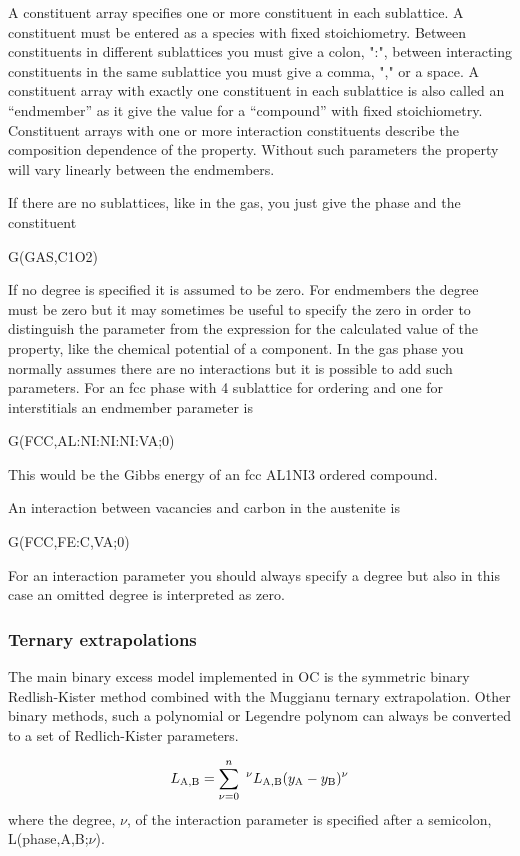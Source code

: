 \documentclass[11pt]{article}
\begin{document}
A constituent array specifies one or more constituent in each
sublattice.  A constituent must be entered as a species with fixed
stoichiometry.  Between constituents in different sublattices you must
give a colon, ":", between interacting constituents in the same
sublattice you must give a comma, "," or a space.  A constituent array
with exactly one constituent in each sublattice is also called an
``endmember'' as it give the value for a ``compound'' with fixed
stoichiometry.  Constituent arrays with one or more interaction
constituents describe the composition dependence of the property.
Without such parameters the property will vary linearly between the
endmembers.

If there are no sublattices, like in the gas, you just give the phase
and the constituent

G(GAS,C1O2)

If no degree is specified it is assumed to be zero.  For endmembers
the degree must be zero but it may sometimes be useful to specify the
zero in order to distinguish the parameter from the expression for the
calculated value of the property, like the chemical potential of a
component.  In the gas phase you normally assumes there are no
interactions but it is possible to add such parameters.  For an fcc
phase with 4 sublattice for ordering and one for interstitials an
endmember parameter is

G(FCC,AL:NI:NI:NI:VA;0)

This would be the Gibbs energy of an fcc AL1NI3 ordered compound.

An interaction between vacancies and carbon in the austenite is

G(FCC,FE:C,VA;0)

For an interaction parameter you should always specify a degree but
also in this case an omitted degree is interpreted as zero.

\subsubsection{Ternary extrapolations}\label{sc:excessparameters}

The main binary excess model implemented in OC is the symmetric binary
Redlish-Kister method combined with the Muggianu ternary
extrapolation.  Other binary methods, such a polynomial or Legendre
polynom can always be converted to a set of Redlich-Kister parameters.

\begin{eqnarray*}
L_{\rm A,B} = \sum_{\nu=0}^n  ~^{\nu}L_{\rm A,B} (y_{\rm A} - y_{\rm B})^{\nu}
\end{eqnarray*}
where the degree, $\nu$, of the interaction parameter is specified
after a semicolon, L(phase,A,B;$\nu$).
\end{document}
